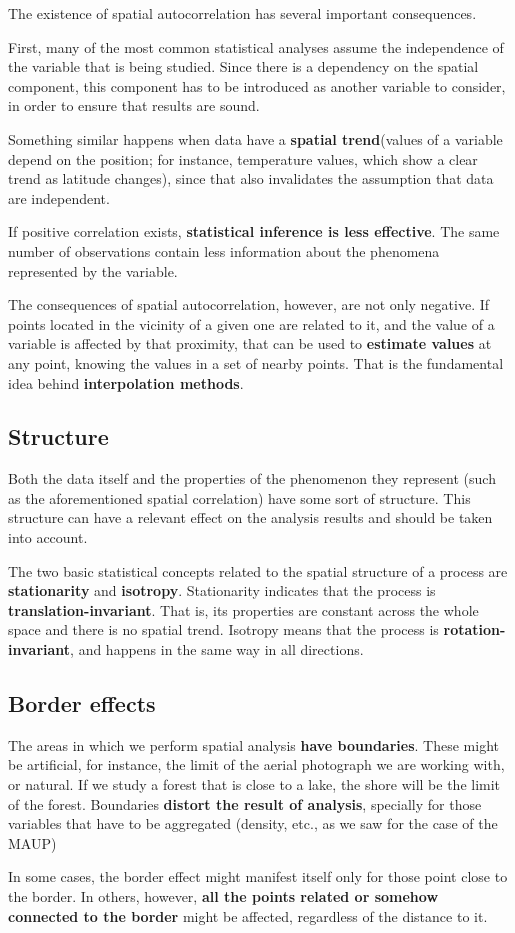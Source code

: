 The existence of spatial autocorrelation has several important consequences.

First, many of the most common statistical analyses assume the independence of the variable that is being studied. Since there is a dependency on the spatial component, this component has to be introduced as another variable to consider, in order to ensure that results are sound.

Something similar happens when data have a \textbf{spatial trend}(values of a variable depend on the position; for instance, temperature values, which show a clear trend as latitude changes), since that also invalidates the assumption that data are independent.

If positive correlation exists, \textbf{statistical inference is less effective}. The same number of observations contain less information about the phenomena represented by the variable.

The consequences of spatial autocorrelation, however, are not only negative. If points located in the vicinity of a given one are related to it, and the value of a variable is affected by that proximity, that can be used to \textbf{estimate values} at any point, knowing the values in a set of nearby points. That is the fundamental idea behind \textbf{interpolation methods}.


\subsection{Structure}

Both the data itself and the properties of the phenomenon they represent (such as the aforementioned spatial correlation) have some sort of structure. This structure can have a relevant effect on the analysis results and should be taken into account.

The two basic statistical concepts related to the spatial structure of a process are \textbf{stationarity} and \textbf{isotropy}. Stationarity indicates that the process is \textbf{translation-in\-vari\-ant}. That is, its properties are constant across the whole space and there is no spatial trend. Isotropy means that the process is \textbf{rotation-invariant}, and happens in the same way in all directions.

\subsection{Border effects}

The areas in which we perform spatial analysis \textbf{have boundaries}. These might be artificial, for instance, the limit of the aerial photograph we are working with, or natural. If we study a forest that is close to a lake, the shore will be the limit of the forest. Boundaries \textbf{distort the result of analysis}, specially for those variables that have to be aggregated (density, etc., as we saw for the case of the MAUP)

In some cases, the border effect might manifest itself only for those point close to the border. In others, however, \textbf{all the points related or somehow connected to the border} might be affected, regardless of the distance to it.

\pagestyle{empty}
